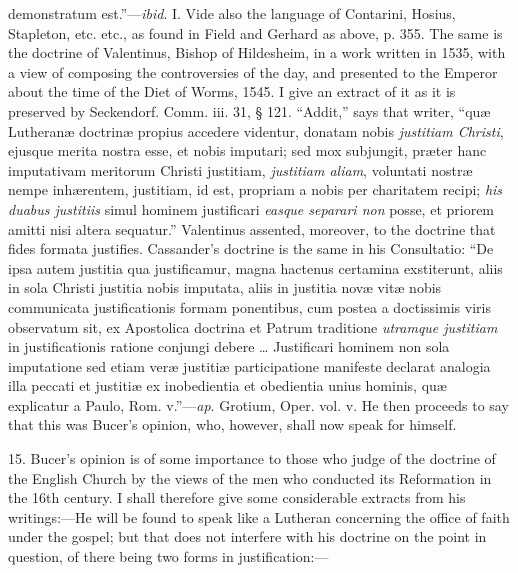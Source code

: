 demonstratum est.''—\emph{ibid}. I. Vide also the language of
Contarini, Hosius, Stapleton, etc. etc., as found in Field and Gerhard
as above, p. 355. The same is the doctrine of Valentinus, Bishop of
Hildesheim, in a work written in 1535, with a view of composing the
controversies of the day, and presented to the Emperor about the time
of the Diet of Worms, 1545. I give an extract of it as it is preserved
by Seckendorf. Comm. iii. 31, § 121. ``Addit,'' says that
writer, ``quæ Lutheranæ doctrinæ propius accedere videntur,
donatam nobis \emph{justitiam Christi}, ejusque merita nostra esse, et
nobis imputari; sed mox subjungit, præter hanc imputativam meritorum
Christi justitiam, \emph{justitiam aliam}, voluntati nostræ nempe
inhærentem, justitiam, id est, propriam a nobis per charitatem recipi;
\emph{his duabus justitiis} simul hominem justificari \emph{easque
separari non} posse, et priorem amitti nisi altera sequatur.''
Valentinus assented, moreover, to the doctrine that fides formata
justifies. Cassander's doctrine is the same in his Consultatio:
``De ipsa autem justitia qua justificamur, magna hactenus
certamina exstiterunt, aliis in sola Christi justitia nobis imputata,
aliis in justitia novæ vitæ nobis communicata justificationis formam
ponentibus, cum postea a doctissimis viris observatum sit, ex
Apostolica doctrina et Patrum traditione \emph{utramque justitiam} in
justificationis ratione conjungi debere … Justificari hominem non
sola imputatione sed etiam veræ justitiæ participatione manifeste
declarat analogia illa peccati et justitiæ ex inobedientia et
obedientia unius hominis, quæ explicatur a Paulo, Rom. v.''—\emph{ap}.
Grotium, Oper. vol. v. He then proceeds to say that this was
Bucer's opinion, who, however, shall now speak for himself.

15. Bucer's opinion is of some importance to those who judge of the
doctrine of the English Church by the views of the men who conducted
its Reformation in the 16th century. I shall therefore give some
considerable extracts from his writings:—He will be found to speak
like a Lutheran concerning the office of faith under the gospel; but
that does not interfere with his doctrine on the point in question, of
there being two forms in justification:—

